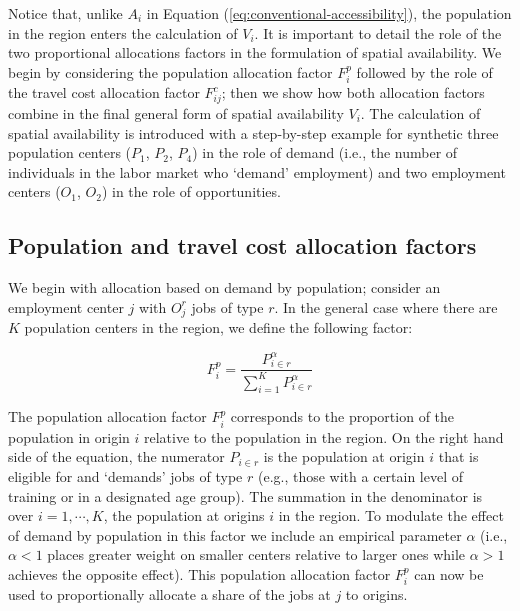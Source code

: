 \documentclass[]{elsarticle} %
\begin{document}
Notice that, unlike \(A_i\) in Equation
(\ref{eq:conventional-accessibility}), the population in the region
enters the calculation of \(V_{i}\). It is important to detail the role
of the two proportional allocations factors in the formulation of
spatial availability. We begin by considering the population allocation
factor \(F^p_{i}\) followed by the role of the travel cost allocation
factor \(F^c_{ij}\); then we show how both allocation factors combine in
the final general form of spatial availability \(V_{i}\). The
calculation of spatial availability is introduced with a step-by-step
example for synthetic three population centers (\(P_1\), \(P_2\),
\(P_4\)) in the role of demand (i.e., the number of individuals in the
labor market who `demand' employment) and two employment centers
(\(O_1\), \(O_2\)) in the role of opportunities.

\hypertarget{population-and-travel-cost-allocation-factors}{%
\subsection{Population and travel cost allocation
factors}\label{population-and-travel-cost-allocation-factors}}

We begin with allocation based on demand by population; consider an
employment center \(j\) with \(O_j^r\) jobs of type \(r\). In the
general case where there are \(K\) population centers in the region, we
define the following factor:

\begin{equation}
\label{eq:pop-alloc-factor}
F^p_{i} = \frac{P_{i\in r}^\alpha}{\sum_{i=1}^K P_{i\in r}^\alpha}
\end{equation}

The population allocation factor \(F^p_{i}\) corresponds to the
proportion of the population in origin \(i\) relative to the population
in the region. On the right hand side of the equation, the numerator
\(P_{i\in r}\) is the population at origin \(i\) that is eligible for
and `demands' jobs of type \(r\) (e.g., those with a certain level of
training or in a designated age group). The summation in the denominator
is over \(i=1,\cdots,K\), the population at origins \(i\) in the region.
To modulate the effect of demand by population in this factor we include
an empirical parameter \(\alpha\) (i.e., \(\alpha <1\) places greater
weight on smaller centers relative to larger ones while \(\alpha>1\)
achieves the opposite effect). This population allocation factor
\(F^p_{i}\) can now be used to proportionally allocate a share of the
jobs at \(j\) to origins.
\end{document}
